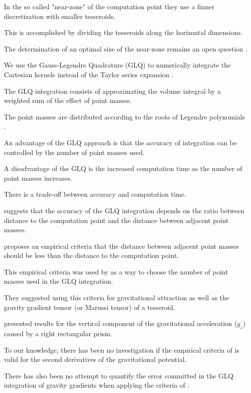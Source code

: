 \documentclass[manuscript]{geophysics}
\begin{document}
In the so called "near-zone" of the computation point they use a finner
discretization with smaller tesseroids.

This is accomplished by dividing the tesseroids along the horizontal
dimensions.

The determination of an optimal size of the near-zone remains an open question
\citep{Grombein2013}.

We use the Gauss-Legendre Quadrature (GLQ) to numerically integrate the Cartesian
kernels instead of the Taylor series expansion \citep{Asgharzadeh2007}.

The GLQ integration consists of approximating the volume integral by a weighted sum of
the effect of point masses.

The point masses are distributed according to the roots of Legendre polynomials
\citep{Hildebrand1987}.

An advantage of the GLQ approach is that the accuracy of integration can be
controlled by the number of point masses used.

A disadvantage of the GLQ is the increased computation time as the number of
point masses increases.

There is a trade-off between accuracy and computation time.

\citet{Ku1977} suggests that the accuracy of the GLQ integration depends on
the ratio between distance to the computation point and the distance between
adjacent point masses.

\citet{Ku1977} proposes an empirical criteria that the distance between adjacent
point masses should be less than the distance to the computation point.

This empirical criteria was used by \citet{Asgharzadeh2007} as a way to
choose the number of point masses used in the GLQ integration.

They suggested using this criteria for gravitational attraction as well as
the gravity gradient tensor (or Marussi tensor) of a tesseroid.

\citet{Ku1977} presented results for the vertical component of the
gravitational acceleration ($g_z$) caused by a right rectangular prism.

To our knowledge, there has been no investigation if the empirical criteria of
\citet{Ku1977} is valid for the second derivatives of the
gravitational potential.

There has also been no attempt to quantify the error committed in the GLQ
integration of gravity gradients when applying the criteria of \citet{Ku1977}.
\end{document}
